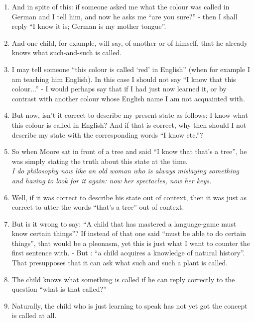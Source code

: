 \documentclass{book}
\begin{document}
\begin{enumerate}
\item
And in spite of this: if someone asked me what the colour was called in German
and I tell him, and now he asks me ``are you sure?'' - then I shall reply ``I
know it is; German is my mother tongue''.

\item
And one child, for example, will say, of another or of himself, that he already
knows what such-and-such is called.

\item
I may tell someone ``this colour is called `red' in English'' (when for example
I am teaching him English). In this case I should not say ``I know that this
colour...'' - I would perhaps say that if I had just now learned it, or by
contrast with another colour whose English name I am not acquainted with.

\item
But now, isn't it correct to describe my present state as follows: I know what
this colour is called in English? And if that is correct, why then should I not
describe my state with the corresponding words ``I know etc.''?

\item
So when Moore sat in front of a tree and said ``I know that that's a tree'', he
was simply stating the truth about this state at the time.
\\
\emph{I do philosophy now like an old woman who is always mislaying something
and having to look for it again: now her spectacles, now her keys.}

\item
Well, if it was correct to describe his state out of context, then it was just
as correct to utter the words ``that's a tree'' out of context.

\item
But is it wrong to say: ``A child that has mastered a language-game must know
certain things''?  If instead of that one said ``must be able to do certain
things'', that would be a pleonasm, yet this is just what I want to counter the
first sentence with. - But : ``a child acquires a knowledge of natural
history''. That presupposes that it can ask what such and such a plant is
called.

\item
The child knows what something is called if he can reply correctly to the
question ``what is that called?''

\item
Naturally, the child who is just learning to speak has not yet got the concept
is called at all.


\end{enumerate}
\end{document}
